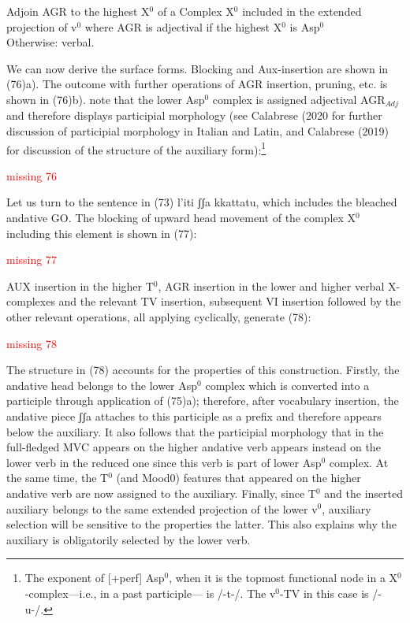 \documentclass[output=paper,colorlinks,citecolor=brown,
]{langscibook}
\begin{document}
\ea  Adjoin AGR to the highest X$^0$ of a Complex X$^0$ included in the extended projection of v$^0$
    \ea where AGR is adjectival if the highest X$^0$ is Asp$^0$\\
        Otherwise:
    \ex verbal.
   \z 
\z

We can now derive the surface forms. Blocking and Aux-insertion are shown in (76)a).  The outcome with further operations of AGR insertion, pruning, etc. is shown in (76)b).  note that the lower Asp$^0$ complex is assigned adjectival AGR$_{Adj}$ and therefore displays participial morphology (see Calabrese (2020 for further discussion of participial morphology in Italian and Latin, and Calabrese (2019) for discussion of the structure of the auxiliary form):\footnote{  The exponent of [+perf] Asp$^0$, when it is the topmost functional node in a X$^0$-complex—i.e., in a past participle— is /-t-/.  The v$^0$-TV in this case is /-u-/.} 


\ea
\textcolor{red}{missing 76}
\z


 Let us turn to the sentence in (73) l’iti ʃʃa   kkattatu, which includes the bleached andative GO.  The blocking of upward head movement of the complex X$^0$ including this element is shown in (77):


\ea
\textcolor{red}{missing 77}
\z

AUX insertion in the higher T$^0$, AGR insertion in the lower and higher verbal X-complexes and the relevant TV insertion, subsequent VI insertion followed by the other relevant operations, all applying cyclically, generate (78): 

\ea
\textcolor{red}{missing 78}
\z

The structure in (78) accounts for the properties of this construction. Firstly, the andative head belongs to the lower Asp$^0$ complex which is converted into a participle through application of (75)a); therefore, after vocabulary insertion, the andative piece ʃʃa attaches to this participle as a prefix and therefore appears below the auxiliary. It also follows that the participial morphology that in the full-fledged MVC appears on the higher andative verb appears instead on the lower verb in the reduced one since this verb is part of lower Asp$^0$ complex.  At the same time, the T$^0$ (and Mood0) features that appeared on the higher andative verb are now assigned to the auxiliary. Finally, since T$^0$ and the inserted auxiliary belongs to the same extended projection of the lower v$^0$, auxiliary selection will be sensitive to the properties the latter. This also explains why the auxiliary is obligatorily selected by the lower verb.
\end{document}
